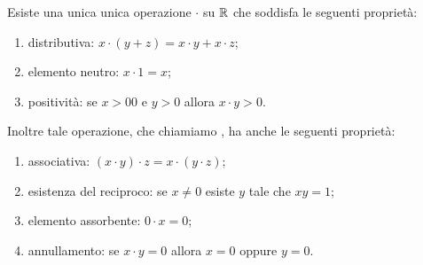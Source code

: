 \begin{theorem}[moltiplicazione]
Esiste una unica unica operazione $\cdot$ su $\mathbb R$ che soddisfa le seguenti 
proprietà: 
\begin{enumerate}
    \item distributiva: $x\cdot(y+z) = x\cdot y + x\cdot z$;
    \item elemento neutro: $x\cdot 1 = x$;
    \item positività: se $x >0 0$ e $y> 0$ allora $x\cdot y > 0$.
\end{enumerate}
Inoltre tale operazione, che chiamiamo ,
ha anche le seguenti proprietà:
\begin{enumerate}
  \item associativa: $(x\cdot y)\cdot z = x \cdot (y\cdot z)$;
  \item esistenza del reciproco: se $x\neq 0$ esiste $y$ tale 
  che $xy = 1$;
  \item elemento assorbente: $0\cdot x = 0$;
  \item annullamento: se $x\cdot y=0$ allora $x=0$ oppure $y=0$.
\end{enumerate}
\end{theorem}
%
